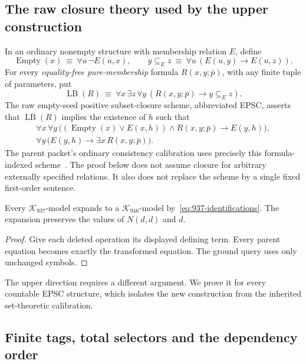 \subsection{The raw closure theory used by the upper construction}

In an ordinary nonempty structure with membership relation \(E\), define
\[
 \operatorname{Empty}(x)\ \equiv\ \forall u\,\neg E(u,x),
 \qquad
 y\subseteq_E z\ \equiv\
       \forall u\,(E(u,y)\rightarrow E(u,z)).
\]
For every \emph{equality-free pure-membership} formula
\(R(x,y;\bar p)\), with any finite tuple of parameters, put
\[
 \operatorname{LB}(R)\ \equiv\
    \forall x\,\exists z\,\forall y\,
                (R(x,y;\bar p)\rightarrow y\subseteq_E z).
\]
The raw empty-seed positive subset-closure scheme, abbreviated EPSC,
asserts that \(\operatorname{LB}(R)\) implies the existence of \(h\)
such that
\begin{align}
 \forall x\,\forall y\,
 \bigl((\operatorname{Empty}(x)\lor E(x,h))\land R(x,y;\bar p)
                    \rightarrow E(y,h)\bigr),\label{eq:937-epsc-close}\\
 \forall y\,\bigl(E(y,h)\rightarrow
                          \exists x\,R(x,y;\bar p)\bigr).
                          \label{eq:937-epsc-support}
\end{align}
The parent packet's ordinary consistency calibration uses precisely
this formula-indexed scheme~\cite{coordinated239}.  The proof below
does not assume closure for arbitrary externally specified relations.
It also does not replace the scheme by a single fixed first-order sentence.

\begin{lemma}
\label{lem:937-reverse}
Every \(\mathcal K_{937}\)-model expands to a
\(\mathcal K_{946}\)-model by~\eqref{eq:937-identifications}.
The expansion preserves the values of \(N(d,d)\) and \(d\).
\end{lemma}

\begin{proof}
Give each deleted operation its displayed defining term.
Every parent equation becomes exactly the transformed equation.
The ground query uses only unchanged symbols.
\end{proof}

The upper direction requires a different argument.  We prove it for
every countable EPSC structure, which isolates the new construction
from the inherited set-theoretic calibration.

\subsection{Finite tags, total selectors and the dependency order}

